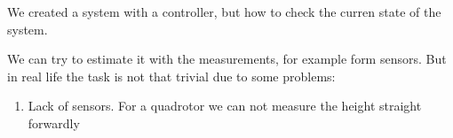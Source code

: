 We created a system with a controller, but how to check the curren state of the system.

We can try to estimate it with the measurements, for example form sensors. But in real life 
the task is not that trivial due to some problems:

\begin{enumerate}
    \item Lack of sensors. For a quadrotor we can not measure the height straight forwardly 
\end{enumerate}
